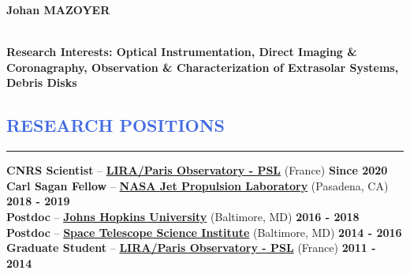 \documentclass[11pt]{article}
\begin{document}
\lhead[]{}
\lfoot{\textcolor{Gray}{CV last update: \yeardate\today}}

\begin{huge}
\noindent\textbf{Johan MAZOYER}
\end{huge}\\


\textbf{Research Interests: Optical Instrumentation, Direct Imaging \& Coronagraphy,
Observation \& Characterization of Extrasolar Systems, Debris Disks}\\


\vspace{-1cm}
\textcolor{RoyalBlue}{\section{\large RESEARCH POSITIONS}
\vspace{-0.35cm}\hrule}
\vspace{0.4cm}

\textbf{CNRS Scientist} --
\href{http://www.obspm.fr/?lang=en}{\textbf{LIRA/Paris Observatory - PSL}} (France)
\hfill     	 { \bf Since 2020}\\


\textbf{Carl Sagan Fellow} --
\href{https://www.jpl.nasa.gov/}{\textbf{NASA Jet Propulsion Laboratory}} (Pasadena, CA)
\hfill      { \bf 2018 - 2019}\\


\textbf{Postdoc} --
\href{http://physics-astronomy.jhu.edu/}{\textbf{Johns Hopkins University}} (Baltimore, MD)
\hfill   	 { \bf 2016 - 2018}\\


\textbf{Postdoc} --
{\href{http://www.stsci.edu}{\textbf{Space Telescope Science Institute}}} (Baltimore, MD)
\hfill        { \bf 2014 - 2016}\\

\textbf{Graduate Student} --
\href{http://www.obspm.fr/?lang=en}{\textbf{LIRA/Paris Observatory - PSL}} (France)
\hfill        { \bf 2011 - 2014}\\
\end{document}
